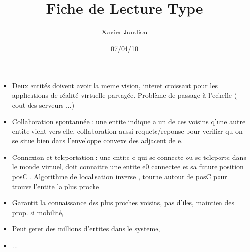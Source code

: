 \documentclass[11pt,a4paper]{article}
\title{Fiche de Lecture Type}
\author{Xavier Joudiou}
\date{07/04/10}
\begin{document}
	
  \begin{itemize}
  \renewcommand{\labelitemi}{$\Rightarrow$}
	\item Deux entités doivent avoir la meme vision, interet croissant pour les applications de réalité virtuelle partagée. Problème de passage à l'echelle ( cout des serveurs ...)
	\item Collaboration spontannée : une entite indique a un de ces voisins q'une autre entite vient vers elle, collaboration aussi requete/reponse pour verifier qu on se situe bien dans l'enveloppe convexe des adjacent de e.
	\item Connexion et teleportation : une entite e qui se connecte ou se teleporte dans le monde virtuel, doit connaitre une entite e0 connectee et sa future position posC . Algorithme de localisation inverse , tourne autour de posC pour trouve l'entite la plus proche
	\item Garantit la connaissance des plus proches voisins, pas d'iles, maintien des prop. si mobilité,
	\item Peut gerer des millions d'entites dans le systeme,
	\item ...
  \end{itemize}
\end{document}
